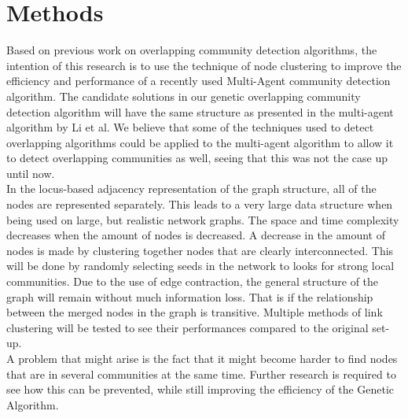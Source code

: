 \documentclass[twoside,twocolumn]{article}
\begin{document}

\section{Methods}
Based on previous work on overlapping community detection algorithms, the intention of this research is to use the technique of node clustering\cite{Ding2016} to improve the efficiency and performance of a recently used Multi-Agent community detection algorithm\cite{multiagent2016}.
The candidate solutions in our genetic overlapping community detection algorithm will have the same structure as presented in the multi-agent algorithm by Li et al. 
We believe that some of the techniques used to detect overlapping algorithms could be applied to the multi-agent algorithm to allow it to detect overlapping communities as well, seeing that this was not the case up until now.\\ \newline
In the locus-based adjacency representation of the graph structure, all of the nodes are represented separately. This leads to a very large data structure when being used on large, but realistic network graphs. 
The space and time complexity decreases when the amount of nodes is decreased.
A decrease in the amount of nodes is made by clustering together nodes that are clearly interconnected.
This will be done by randomly selecting seeds in the network to looks for strong local communities.
Due to the use of edge contraction, the general structure of the graph will remain without much information loss. That is if the relationship between the merged nodes in the graph is transitive.
Multiple methods of link clustering will be tested to see their performances compared to the original set-up.\\ \newline
A problem that might arise is the fact that it might become harder to find nodes that are in several communities at the same time.
Further research is required to see how this can be prevented, while still improving the efficiency of the Genetic Algorithm.





\end{document}
